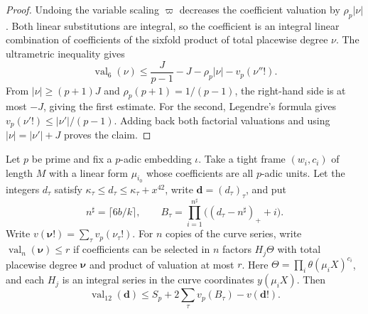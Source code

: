 \begin{proof}
Undoing the variable scaling $\varpi$ decreases the coefficient valuation by $\rho_p|\nu|$. Both linear substitutions are integral, so the coefficient is an integral linear combination of coefficients of the sixfold product of total placewise degree $\nu$. The ultrametric inequality gives
\[
 \operatorname{val}_6(\nu)\le \frac{J}{p-1}-J-\rho_p|\nu|-v_p(\nu''!).
\]
From $|\nu|\ge(p+1)J$ and $\rho_p(p+1)=1/(p-1)$, the right-hand side is at most $-J$, giving the first estimate. For the second, Legendre's formula gives $v_p(\nu'!)\le|\nu'|/(p-1)$. Adding back both factorial valuations and using $|\nu|=|\nu'|+J$ proves the claim.
\end{proof}

\begin{lemma}
\label{lem:c-derivative-valuation}
\emitthmsource
Let $p$ be prime and fix a $p$-adic embedding $\iota$. Take a tight frame $(w_i,c_i)$ of length $M$ with a linear form $\mu_{i_0}$ whose coefficients are all $p$-adic units. Let the integers $d_\tau$ satisfy $\kappa_\tau\le d_\tau\le\kappa_\tau+x^{42}$, write $\boldsymbol d=(d_\tau)_\tau$, and put
\[
 n^\sharp=\lceil6b/k\rceil,\qquad
 B_\tau=\prod_{i=1}^{n^\sharp}\bigl((d_\tau-n^\sharp)_++i\bigr).
\]
Write $v(\boldsymbol\nu!)=\sum_\tau v_p(\nu_\tau!)$. For $n$ copies of the curve series, write $\operatorname{val}_n(\boldsymbol\nu)\le r$ if coefficients can be selected in $n$ factors $H_j\Theta$ with total placewise degree $\boldsymbol\nu$ and product of valuation at most $r$. Here $\Theta=\prod_i\theta(\mu_i X)^{c_i}$, and each $H_j$ is an integral series in the curve coordinates $y(\mu_i X)$. Then
\[
 \operatorname{val}_{12}(\boldsymbol d)
 \le S_p+2\sum_\tau v_p(B_\tau)-v(\boldsymbol d!).
\]
\end{lemma}

